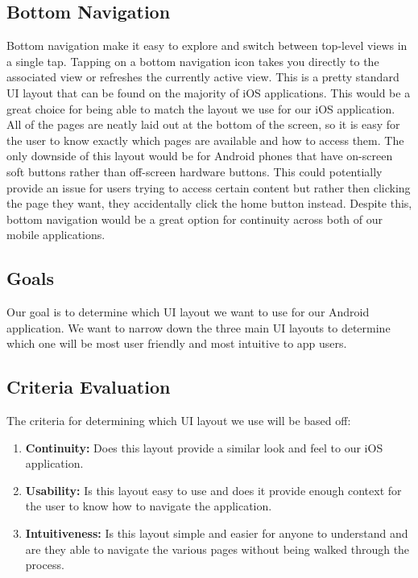 \documentclass[letterpaper,10pt,draftclsnofoot,onecolumn,titlepage]{IEEEtran}
\begin{document}
		\subsection{Bottom Navigation}
			Bottom navigation make it easy to explore and switch between top-level views in a single tap.
			Tapping on a bottom navigation icon takes you directly to the associated view or refreshes the currently active view. \cite{Material-Bottom-Nav}
			This is a pretty standard UI layout that can be found on the majority of iOS applications.
			This would be a great choice for being able to match the layout we use for our iOS application.
			All of the pages are neatly laid out at the bottom of the screen, so it is easy for the user to know exactly which pages are available and how to access them.
			The only downside of this layout would be for Android phones that have on-screen soft buttons rather than off-screen hardware buttons.
			This could potentially provide an issue for users trying to access certain content but rather then clicking the page they want, they accidentally click the home button instead.
			Despite this, bottom navigation would be a great option for continuity across both of our mobile applications.

		\subsection{Goals}
			Our goal is to determine which UI layout we want to use for our Android application.
			We want to narrow down the three main UI layouts to determine which one will be most user friendly and most intuitive to app users.
		\subsection{Criteria Evaluation}
			The criteria for determining which UI layout we use will be based off:
			\begin{enumerate}
				\item \textbf{Continuity:} Does this layout provide a similar look and feel to our iOS application.
				\item \textbf{Usability:} Is this layout easy to use and does it provide enough context for the user to know how to navigate the application.
				\item \textbf{Intuitiveness:} Is this layout simple and easier for anyone to understand and are they able to navigate the various pages without being walked through the process.
			\end{enumerate}
\end{document}
